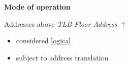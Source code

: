\documentclass{beamer}
\begin{document}
\begin{frame}
\begin{center}
\begin{block}{\textbf{{\small Mode of operation}}}
\begin{minipage}{0.45\textwidth}
			\end{minipage}
			\hspace{0pt plus 1 filll}
			\begin{minipage}{0.45\textwidth}
				\begin{scriptsize}
					Addresses above \textit{TLB Floor Address} $\uparrow$
					\begin{itemize}
						\item considered \underline{logical}
						\item subject to address translation
					\end{itemize}
				\end{scriptsize}
			\end{minipage}
		\end{block}
	\end{center}
\end{frame}
\end{document}
